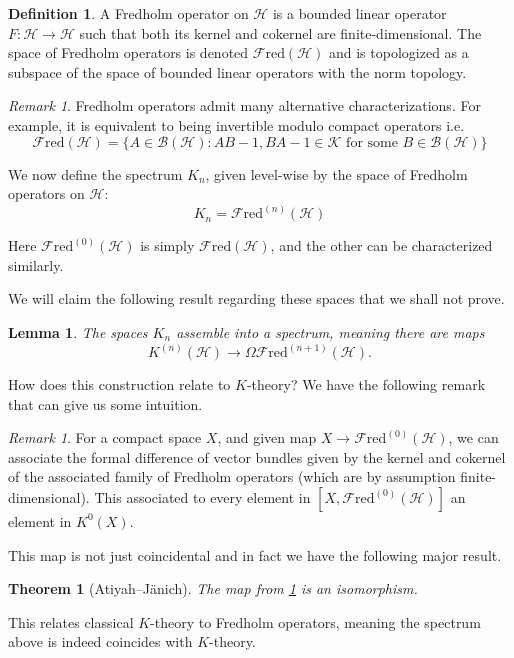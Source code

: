 \documentclass[a4paper]{book}
\newcommand{\lB}{\mathcal{B}}
\newcommand{\lF}{\mathcal{F}}
\newcommand{\lH}{\mathcal{H}}
\newcommand{\Fred}{\lF\mathrm{red}}
\newtheorem{theorem}[equation]{Theorem}
\newtheorem{lemma}[equation]{Lemma}
\theoremstyle{definition}
\newtheorem{definition}[equation]{Definition}
\theoremstyle{remark}
\newtheorem{remark}[equation]{Remark}
\numberwithin{equation}{section}
\begin{document}
\begin{definition}
	A Fredholm operator on $\lH$ is a bounded linear operator $F \colon \lH \to \lH$ such that both its kernel and cokernel are finite-dimensional. The space of Fredholm operators is denoted $\Fred(\lH)$ and is topologized as a subspace of the space of bounded linear operators with the norm topology.
\end{definition}

\begin{remark}
Fredholm operators admit many alternative characterizations. For example, it is equivalent to being invertible modulo compact operators i.e. 
\[\Fred(\lH) = \{A \in \lB(\lH) : AB - 1, BA - 1 \in \mathscr{K} \text{ for some } B \in \lB(\lH)\} \]
\end{remark}

We now define the spectrum $K_n$, given level-wise by the space of Fredholm operators on $\lH$:
\[ K_n = \Fred^{(n)}(\lH)\]

Here $\Fred^{(0)}(\lH)$ is simply $\Fred(\lH)$, and the other can be characterized similarly.

We will claim the following result regarding these spaces that we shall not prove.

\begin{lemma}
 The spaces $K_n$ assemble into a spectrum, meaning there are maps
	\[ K^{(n)}(\lH) \to \Omega \Fred^{(n+1)}(\lH). \]
\end{lemma}

How does this construction relate to $K$-theory? We have the following remark that can give us some intuition.

\begin{remark} \label{rem:Fredholm_Ktheory_map}
 For a compact space $X$, and given map $X \to \Fred^{(0)}(\lH)$, we can associate the formal difference of vector bundles given by the kernel and cokernel of the associated family of Fredholm operators (which are by assumption finite-dimensional). This associated to every element in $[X,\Fred^{(0)}(\lH)]$ an element in $K^0(X)$. 
\end{remark}

This map is not just coincidental and in fact we have the following major result.

\begin{theorem}[Atiyah--{J\"anich}]
 The map from \cref{rem:Fredholm_Ktheory_map} is an isomorphism.
\end{theorem}

This relates classical $K$-theory to Fredholm operators, meaning the spectrum above is indeed coincides with $K$-theory.
\end{document}
